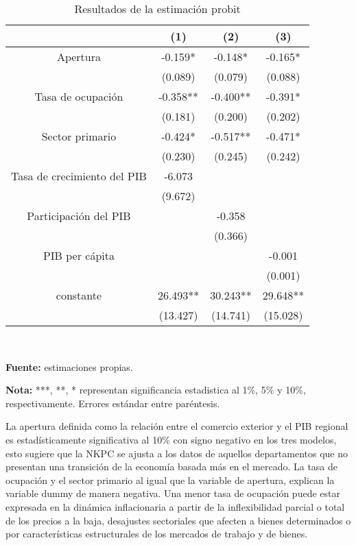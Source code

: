 \begin{table}[H]
\centering
\caption{Resultados de la estimación probit}
\begin{tabular}{cccc}
\hline
& (1)   & (2)   & (3) \\ 
\hline
\hline
\vspace{-0.3cm}   Apertura & -0.159* & -0.148* & -0.165* \\
& \scriptsize{(0.089)} & \scriptsize{(0.079)} & \scriptsize{(0.088)} \\
\vspace{-0.3cm}    Tasa de ocupación  & -0.358** & -0.400** & -0.391* \\
& \scriptsize{(0.181)} & \scriptsize{(0.200)} & \scriptsize{(0.202)} \\
\vspace{-0.3cm}    Sector primario  & -0.424* & -0.517** & -0.471* \\
& \scriptsize{(0.230)} & \scriptsize{(0.245)} & \scriptsize{(0.242)} \\
\vspace{-0.3cm}    Tasa de crecimiento del PIB & -6.073 &       &  \\
& \scriptsize{(9.672)} &       &  \\
\vspace{-0.3cm}    Participación del PIB  &       & -0.358 &  \\
&       & \scriptsize{(0.366)} &  \\
\vspace{-0.3cm}     PIB per cápita  &       &       & -0.001 \\
&       &       & \scriptsize{(0.001)} \\
\vspace{-0.3cm}     constante & 26.493** & 30.243** & 29.648** \\
& \scriptsize{(13.427)} & \scriptsize{(14.741)} & \scriptsize{(15.028)} \\
\hline
\end{tabular}%
\label{probit}\\
  \raggedright  \scriptsize \textbf{Fuente:} estimaciones propias. \\
\raggedright  \scriptsize \textbf{Nota:} ***,  **, * representan significancia estadistica al 1\%, 5\% y 10\%, respectivamente. Errores estándar entre paréntesis.
\end{table}%

La apertura definida como la relación entre el comercio exterior y el PIB regional es estadísticamente significativa al 10\% con signo negativo en los tres modelos, esto sugiere que la NKPC se ajusta a los datos de aquellos departamentos que no presentan una transición de la economía basada más en el mercado. La tasa de ocupación  y el sector primario al igual que la variable de apertura, explican la variable dummy de manera negativa. Una menor tasa de ocupación puede estar expresada en la dinámica inflacionaria a partir de la inflexibilidad parcial o total de los precios a la baja, desajustes sectoriales que afecten a bienes determinados o por características estructurales de los mercados de trabajo y de bienes.\\

